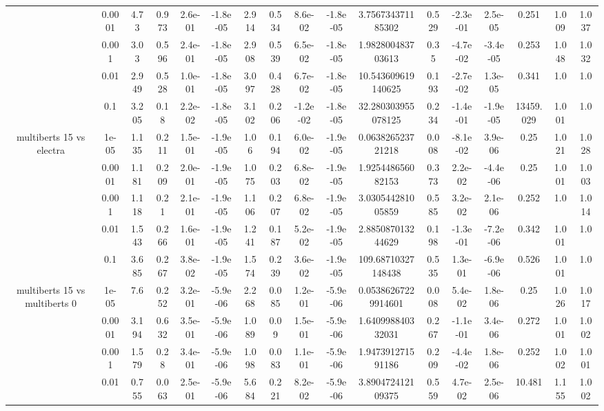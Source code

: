 \begin{tabular}{|c|c|c|c|c|c|c|c|c|c|c|c|c|c|c|c|c|}
 & 0.0001 & 4.73 & 0.973 & 2.6e-01 & -1.8e-05 & 2.914 & 0.534 & 8.6e-02 & -1.8e-05 & 3.756734371185302 & 0.529 & -2.3e-01 & 2.5e-05 & 0.251 & 1.009 & 1.037 \\
 & 0.001 & 3.03 & 0.596 & 2.4e-01 & -1.8e-05 & 2.908 & 0.539 & 6.5e-02 & -1.8e-05 & 1.982800483703613 & 0.35 & -4.7e-02 & -3.4e-05 & 0.253 & 1.048 & 1.032 \\
 & 0.01 & 2.949 & 0.528 & 1.0e-01 & -1.8e-05 & 3.097 & 0.428 & 6.7e-02 & -1.8e-05 & 10.543609619140625 & 0.193 & -2.7e-02 & 1.3e-05 & 0.341 & 1.0 & 1.0 \\
 & 0.1 & 3.205 & 0.18 & 2.2e-02 & -1.8e-05 & 3.102 & 0.206 & -1.2e-02 & -1.8e-05 & 32.280303955078125 & 0.234 & -1.4e-01 & -1.9e-05 & 13459.029 & 1.001 & 1.0 \\
\hline
\multirow{5}{*}{multiberts 15 vs electra } & 1e-05 & 1.135 & 0.211 & 1.5e-01 & -1.9e-05 & 1.06 & 0.194 & 6.0e-02 & -1.9e-05 & 0.063826523721218 & 0.008 & -8.1e-02 & 3.9e-06 & 0.25 & 1.021 & 1.028 \\
 & 0.0001 & 1.181 & 0.209 & 2.0e-01 & -1.9e-05 & 1.075 & 0.203 & 6.8e-02 & -1.9e-05 & 1.925448656082153 & 0.373 & 2.2e-02 & -4.4e-06 & 0.25 & 1.001 & 1.003 \\
 & 0.001 & 1.118 & 0.21 & 2.1e-01 & -1.9e-05 & 1.106 & 0.207 & 6.8e-02 & -1.9e-05 & 3.030544281005859 & 0.585 & 3.2e-02 & 2.1e-06 & 0.252 & 1.0 & 1.014 \\
 & 0.01 & 1.543 & 0.266 & 1.6e-01 & -1.9e-05 & 1.241 & 0.187 & 5.2e-02 & -1.9e-05 & 2.885087013244629 & 0.198 & -1.3e-01 & -7.2e-06 & 0.342 & 1.001 & 1.0 \\
 & 0.1 & 3.685 & 0.267 & 3.8e-02 & -1.9e-05 & 1.574 & 0.239 & 3.6e-02 & -1.9e-05 & 109.68710327148438 & 0.535 & 1.3e-01 & -6.9e-06 & 0.526 & 1.001 & 1.0 \\
\hline
\multirow{5}{*}{multiberts 15 vs multiberts 0} & 1e-05 & 7.6 & 0.252 & 3.2e-01 & -5.9e-06 & 2.268 & 0.085 & 1.2e-01 & -5.9e-06 & 0.05386267229914601 & 0.008 & 5.4e-02 & 1.8e-06 & 0.25 & 1.026 & 1.017 \\
 & 0.0001 & 3.194 & 0.632 & 3.5e-01 & -5.9e-06 & 1.089 & 0.09 & 1.5e-01 & -5.9e-06 & 1.640998840332031 & 0.267 & -1.1e-01 & 3.4e-06 & 0.272 & 1.001 & 1.002 \\
 & 0.001 & 1.579 & 0.28 & 3.4e-01 & -5.9e-06 & 1.098 & 0.083 & 1.1e-01 & -5.9e-06 & 1.947391271591186 & 0.209 & -4.4e-02 & 1.8e-06 & 0.252 & 1.002 & 1.001 \\
 & 0.01 & 0.755 & 0.063 & 2.5e-01 & -5.9e-06 & 5.684 & 0.221 & 8.2e-02 & -5.9e-06 & 3.890472412109375 & 0.559 & 4.7e-02 & 2.5e-06 & 10.481 & 1.155 & 1.002 \\

\end{tabular}
